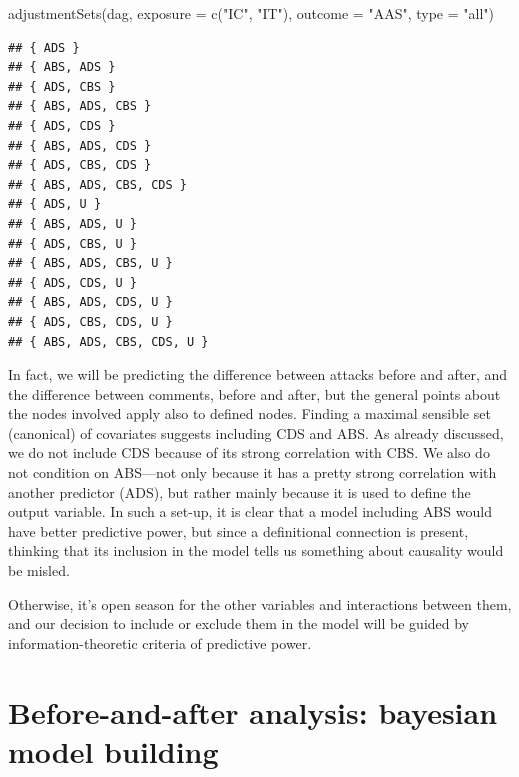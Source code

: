 \documentclass[
  10pt,
  dvipsnames, enabledeprecatedfontcommands]{scrartcl}
\newenvironment{Shaded}{\begin{snugshade}}{\end{snugshade}}
\newcommand{\AttributeTok}[1]{\textcolor[rgb]{0.77,0.63,0.00}{#1}}
\newcommand{\FunctionTok}[1]{\textcolor[rgb]{0.00,0.00,0.00}{#1}}
\newcommand{\NormalTok}[1]{#1}
\newcommand{\StringTok}[1]{\textcolor[rgb]{0.31,0.60,0.02}{#1}}
\begin{document}
\begin{Shaded}
\begin{Highlighting}[]
\FunctionTok{adjustmentSets}\NormalTok{(dag, }\AttributeTok{exposure =} \FunctionTok{c}\NormalTok{(}\StringTok{"IC"}\NormalTok{, }\StringTok{"IT"}\NormalTok{), }\AttributeTok{outcome =} \StringTok{"AAS"}\NormalTok{, }\AttributeTok{type =} \StringTok{"all"}\NormalTok{)}
\end{Highlighting}
\end{Shaded}

\begin{verbatim}
## { ADS }
## { ABS, ADS }
## { ADS, CBS }
## { ABS, ADS, CBS }
## { ADS, CDS }
## { ABS, ADS, CDS }
## { ADS, CBS, CDS }
## { ABS, ADS, CBS, CDS }
## { ADS, U }
## { ABS, ADS, U }
## { ADS, CBS, U }
## { ABS, ADS, CBS, U }
## { ADS, CDS, U }
## { ABS, ADS, CDS, U }
## { ADS, CBS, CDS, U }
## { ABS, ADS, CBS, CDS, U }
\end{verbatim}

\normalsize

In fact, we will be predicting the difference between attacks before and
after, and the difference between comments, before and after, but the
general points about the nodes involved apply also to defined nodes.
Finding a maximal sensible set (canonical) of covariates suggests
including \textsf{CDS} and \textsf{ABS}. As already discussed, we do not
include \textsf{CDS} because of its strong correlation with
\textsf{CBS}. We also do not condition on \textsf{ABS}---not only
because it has a pretty strong correlation with another predictor
(\textsf{ADS}), but rather mainly because it is used to define the
output variable. In such a set-up, it is clear that a model including
\textsf{ABS} would have better predictive power, but since a
definitional connection is present, thinking that its inclusion in the
model tells us something about causality would be misled.

Otherwise, it's open season for the other variables and interactions
between them, and our decision to include or exclude them in the model
will be guided by information-theoretic criteria of predictive power.

\hypertarget{before-and-after-analysis-bayesian-model-building}{%
\section{Before-and-after analysis: bayesian model
building}\label{before-and-after-analysis-bayesian-model-building}}
\end{document}
